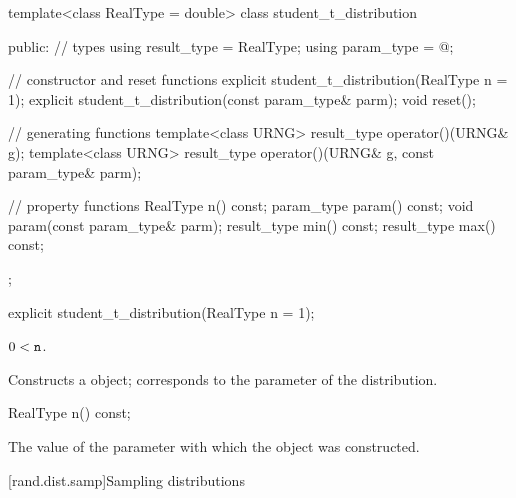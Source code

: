\begin{codeblock}
template<class RealType = double>
 class student_t_distribution
{
public:
 // types
 using result_type = RealType;
 using param_type  = @\unspec@;

 // constructor and reset functions
 explicit student_t_distribution(RealType n = 1);
 explicit student_t_distribution(const param_type& parm);
 void reset();

 // generating functions
 template<class URNG>
   result_type operator()(URNG& g);
 template<class URNG>
   result_type operator()(URNG& g, const param_type& parm);

 // property functions
 RealType n() const;
 param_type param() const;
 void param(const param_type& parm);
 result_type min() const;
 result_type max() const;
};
\end{codeblock}


%
\begin{itemdecl}
explicit student_t_distribution(RealType n = 1);
\end{itemdecl}

\begin{itemdescr}
\pnum\requires
 $ 0 < \texttt{n} $.

\pnum\effects Constructs a  object;
  corresponds to the parameter of the distribution.
\end{itemdescr}

%
%
\begin{itemdecl}
RealType n() const;
\end{itemdecl}

\begin{itemdescr}
\pnum\returns The value of the  parameter
 with which the object was constructed.
\end{itemdescr}%
%



[rand.dist.samp]{Sampling distributions}%
%



